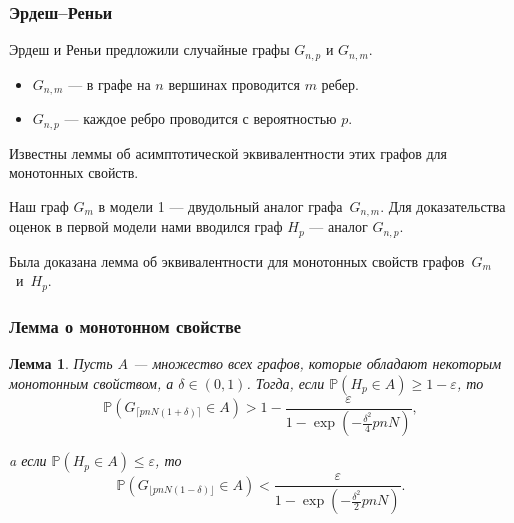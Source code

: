 \documentclass[pdf, intlimits, 12pt, unicode]{beamer} %
\newcommand{\PRob}{\mathbb P}
\newcommand{\leqs}{\leqslant}
\newcommand{\geqs}{\geqslant}
\newcommand{\eps}{\varepsilon}
\newtheorem*{lemmaa}{Лемма}
\begin{document}
\begin{frame}
	\frametitle{Эрдеш--Реньи}
	Эрдеш и Реньи предложили случайные графы $G_{n, p}$ и $G_{n, m}$.
	\begin{itemize}
		\item $G_{n,m}$ --- в графе на $n$ вершинах проводится $m$ ребер.
		\item $G_{n,p}$ --- каждое ребро проводится с вероятностью $p$.
	\end{itemize}
	Известны леммы об асимптотической эквивалентности этих графов для монотонных свойств.
	
	\bigskip
	
	Наш граф $G_m$ в модели 1 --- двудольный аналог графа~$G_{n,m}$.
	Для доказательства оценок в первой модели нами вводился граф $H_p$ --- аналог $G_{n,p}$.
	
	Была доказана лемма об эквивалентности для монотонных свойств графов~$G_m$~и~$H_p$.
	
	
\end{frame}


\begin{frame}
	\frametitle{Лемма о монотонном свойстве}
	\begin{lemmaa}
		Пусть $A$ --- множество всех графов, которые обладают некоторым монотонным свойством, а $\delta \in (0,1)$.
		Тогда, если $\PRob( H_p \in A) \geqs 1 - \eps$, то
			\vspace{-3mm}
			\begin{equation*} \label{l1_1}
			\PRob(G_{\lceil pnN(1+\delta) \rceil} \in A) > 1 - \frac{\eps}{1 - \exp\left(-\frac{\delta^2}{4}pnN\right)},
			\end{equation*}
			\vspace{-7mm}
			
		a если $\PRob( H_p \in A) \leqs \eps$, то
			\vspace{-3mm}
			\begin{equation*}\label{l1_2}
			\PRob(G_{\lfloor pnN(1-\delta) \rfloor} \in A) < \frac{\eps}{1 - \exp\left(-\frac{\delta^2}{2}pnN\right)}.
			\end{equation*}
	\end{lemmaa}

\end{frame}
\end{document}

